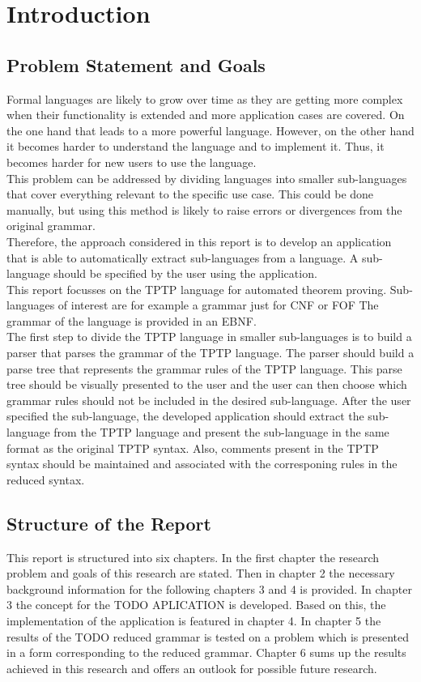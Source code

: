 
\chapter{Introduction}\label{cha:Introduction}

\section{Problem Statement and Goals}\label{sec:Aufgabenstellung}
Formal languages are likely to grow over time as they are getting more complex when their functionality is extended and more application cases are covered.
On the one hand that leads to a more powerful language.
However, on the other hand it becomes harder to understand the language and to implement it.
Thus, it becomes harder for new users to use the language.\\
This problem can be addressed by dividing languages into smaller sub-languages that cover everything relevant to the specific use case. 
This could be done manually, but using this method is likely to raise errors or divergences from the original grammar.\\
Therefore, the approach considered in this report is to develop an application that is able to automatically extract sub-languages from a language.
A sub-language should be specified by the user using the application.\\
This report focusses on the \acf{TPTP} language for automated theorem proving.
Sub-languages of interest are for example a grammar just for \ac{CNF} or \ac{FOF}
The grammar of the language is provided in an \acf{EBNF}.\\
The first step to divide the \ac{TPTP} language in smaller sub-languages is to build a parser that parses the grammar of the \ac{TPTP} language.
The parser should build a parse tree that represents the grammar rules of the \ac{TPTP} language.
This parse tree should be visually presented to the user and the user can then choose which grammar rules should not be included in the desired sub-language.
After the user specified the sub-language, the developed application should extract the sub-language from the \ac{TPTP} language and present the sub-language in the same format as the original \ac{TPTP} syntax.
Also, comments present in the \ac{TPTP} syntax should be maintained and associated with the corresponing rules in the reduced syntax.
\section{Structure of the Report}\label{sec:IntroductionStructure}
This report is structured into six chapters. In the first chapter the research problem and goals of this research are stated.
Then in chapter 2 the necessary background information for the following chapters 3 and 4 is provided.
In chapter 3 the concept for the TODO APLICATION is developed.
Based on this, the implementation of the application is featured in chapter 4.
In chapter 5 the results of the TODO reduced grammar is tested on a problem which is presented in a form corresponding to the reduced grammar.
Chapter 6 sums up the results achieved in this research and offers an outlook for possible future research.